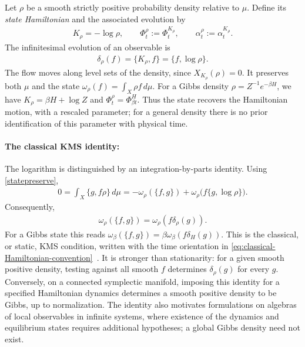 \documentclass[a4paper,11pt]{article}
\theoremstyle{definition}
\begin{document}
Let $\rho$ be a smooth strictly positive probability density relative to $\mu$. Define its {\it state Hamiltonian} and the associated evolution by
\begin{align}\label{eq:classical-state-Hamiltonian}
    K_\rho=-\log\rho,\qquad
    \Phi_t^\rho:=\Phi_t^{K_\rho},\qquad
    \alpha_t^\rho:=\alpha_t^{K_\rho}.
\end{align}
The infinitesimal evolution of an observable is
\begin{align}\label{eq:classical-state-derivation}
    \delta_\rho(f)=\{K_\rho,f\}=\{f,\log\rho\}.
\end{align}
The flow moves along level sets of the density, since $X_{K_\rho}(\rho)=0$. It preserves both $\mu$ and the state $\omega_\rho(f)=\int_X\rho f\,d\mu$. For a Gibbs density $\rho=Z^{-1}e^{-\beta H}$, we have $K_\rho=\beta H+\log Z$ and $\Phi_t^\rho=\Phi_{\beta t}^H$. Thus the state recovers the Hamiltonian motion, with a rescaled parameter; for a general density there is no prior identification of this parameter with physical time.

\paragraph{The classical KMS identity:}
The logarithm is distinguished by an integration-by-parts identity. Using \eqref{statepreserve},
\begin{align}
    0=\int_X\{g,f\rho\}\,d\mu
    =-\omega_\rho(\{f,g\})+
    \omega_\rho\bigl(f\{g,\log\rho\}\bigr).
\end{align}
Consequently,
\begin{align}\label{KMSclassical}
    \omega_\rho(\{f,g\})=\omega_\rho(f\delta_\rho(g)).
\end{align}
For a Gibbs state this reads $\omega_\beta(\{f,g\})=\beta\omega_\beta(f\delta_H(g))$. This is the classical, or static, KMS condition, written with the time orientation in \eqref{eq:classical-Hamiltonian-convention}~\cite{vanDeVen2022}. It is stronger than stationarity: for a given smooth positive density, testing against all smooth $f$ determines $\delta_\rho(g)$ for every $g$. Conversely, on a connected symplectic manifold, imposing this identity for a specified Hamiltonian dynamics determines a smooth positive density to be Gibbs, up to normalization. The identity also motivates formulations on algebras of local observables in infinite systems, where existence of the dynamics and equilibrium states requires additional hypotheses; a global Gibbs density need not exist.
\end{document}
